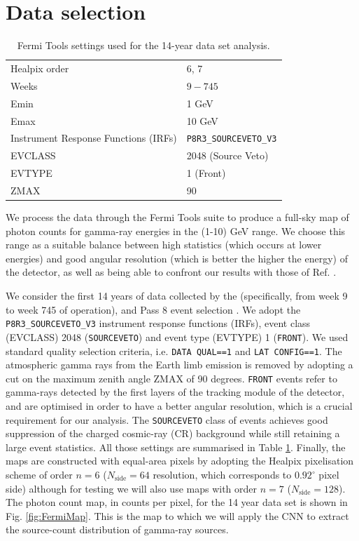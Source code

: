\section{Data selection}
\label{sec:dataselection}

\begin{table}[t]
\centering
\begin{tabular}{ | l| l|  }
\hline
Healpix order & 6, 7  \\ 
Weeks & $9-745$  \\ 
Emin & 1 GeV \\
Emax & 10 GeV \\
Instrument Response Functions (IRFs) & \verb|P8R3_SOURCEVETO_V3| \\
EVCLASS & 2048 (Source Veto)  \\ 
EVTYPE & 1 (Front)  \\
ZMAX & 90 \\
\hline
\end{tabular}
\caption{Fermi Tools settings used for the 14-year data set analysis. }
\label{tab:dnds:settings}
\end{table}

We process the \fermi data through the Fermi Tools suite \cite{Fermitools} to produce a full-sky map of photon counts for gamma-ray energies in the (1-10) GeV  range. We choose this range as a suitable balance between high statistics (which occurs at lower energies) and good angular resolution (which is better the higher the energy) of the detector, as well as being able to confront our results with those of Ref. \cite{Cuoco-1pdf}.

We consider the first 14 years of data collected by the \fermi (specifically, from week 9 to week 745 of operation), and Pass 8 event selection \cite{Fermi-LAT:2013jgq,Bruel:2018lac}. We adopt the \verb|P8R3_SOURCEVETO_V3| instrument response functions (IRFs), event class (EVCLASS) 2048 ({\tt SOURCEVETO}) and event type (EVTYPE) 1 (\verb|FRONT|). We used standard quality selection criteria, i.e. \verb|DATA QUAL==1| and
\verb|LAT CONFIG==1|.
The atmospheric gamma rays from the Earth limb emission is removed by adopting a cut
on the maximum zenith angle ZMAX of 90 degrees.
\verb|FRONT| events refer to gamma-rays detected by the first layers of the tracking module of the \fermi detector, and are optimised in order to have a better angular resolution, which is a crucial requirement for our analysis. 
The {\tt SOURCEVETO} class of events achieves good suppression of the charged cosmic-ray (CR) background while still retaining a large event statistics. All those settings are summarised in Table \ref{tab:dnds:settings}. Finally, the maps are constructed with equal-area pixels by adopting the Healpix \cite{healpix} pixelisation scheme of order $n=6$ ($N_\textrm{side} = 64$ resolution, which corresponds to $0.92^\circ$ pixel side) although for testing we will also use maps with order $n=7$ ($N_\textrm{side} = 128$).  
The photon count map, in counts per pixel, for the 14 year data set is shown in Fig. \ref{fig:FermiMap}. This is the map to which we will apply the CNN to extract the source-count distribution of gamma-ray sources. 

